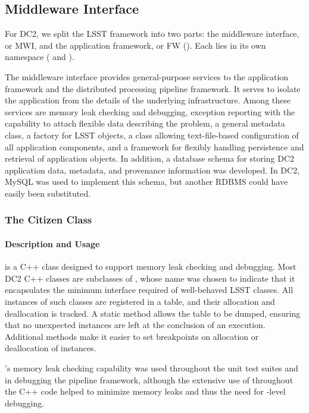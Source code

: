 
\subsection{Middleware Interface}
\label{MWI}

For DC2, we split the LSST framework into two parts: the middleware
interface, or MWI, and the application framework, or FW ().
Each lies in its own namespace ( and ).

The middleware interface provides general-purpose services to the
application framework and the distributed processing pipeline framework.
It serves to isolate the application from the details of the underlying
infrastructure.  Among these services are memory leak checking and
debugging, exception reporting with the capability to attach flexible
data describing the problem, a general metadata class, a factory for
LSST objects, a class allowing text-file-based configuration of all
application components, and a framework for flexibly handling
persistence and retrieval of application objects.  In addition, a
database schema for storing DC2 application data, metadata, and
provenance information was developed.  In DC2, MySQL was used to
implement this schema, but another RDBMS could have easily been
substituted.


\subsubsection{The Citizen Class}

\paragraph{Description and Usage}

 is a C++ class designed to support memory leak checking and
debugging.  Most DC2 C++ classes are subclasses of , whose name
was chosen to indicate that it encapsulates the minimum interface
required of well-behaved LSST classes.  All instances of such classes
are registered in a table, and their allocation and deallocation is
tracked.  A static method allows the table to be dumped, ensuring that
no unexpected instances are left at the conclusion of an execution.
Additional methods make it easier to set breakpoints on allocation or
deallocation of instances.

's memory leak checking capability was used throughout the unit
test suites and in debugging the pipeline framework, although the
extensive use of  throughout the C++ code
helped to minimize memory leaks and thus the need for -level
debugging.

